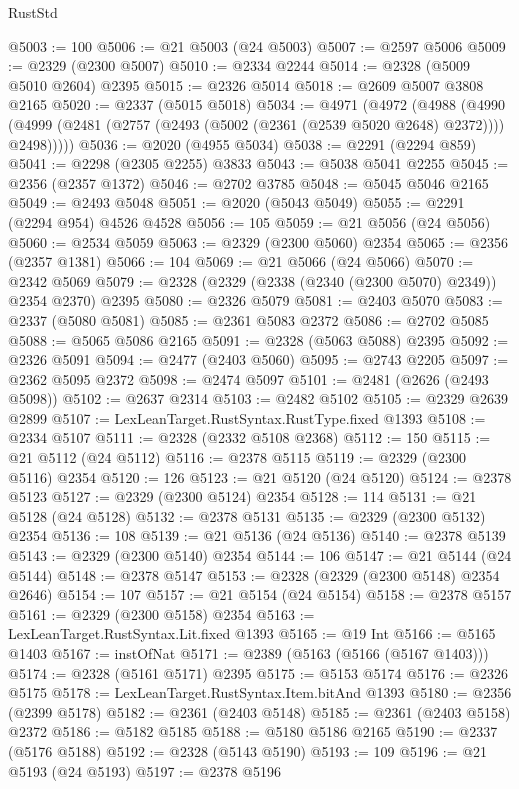 \begin{lexlean}{RustStd}
\begin{coremodule}
@5003 := 100
@5006 := @21 @5003 (@24 @5003)
@5007 := @2597 @5006
@5009 := @2329 (@2300 @5007)
@5010 := @2334 @2244
@5014 := @2328 (@5009 @5010 @2604) @2395
@5015 := @2326 @5014
@5018 := @2609 @5007 @3808 @2165
@5020 := @2337 (@5015 @5018)
@5034 := @4971
    (@4972
      (@4988
        (@4990 (@4999 (@2481 (@2757 (@2493 (@5002 (@2361 (@2539 @5020 @2648) @2372)))) @2498)))))
@5036 := @2020 (@4955 @5034)
@5038 := @2291 (@2294 @859)
@5041 := @2298 (@2305 @2255) @3833
@5043 := @5038 @5041 @2255
@5045 := @2356 (@2357 @1372)
@5046 := @2702 @3785
@5048 := @5045 @5046 @2165
@5049 := @2493 @5048
@5051 := @2020 (@5043 @5049)
@5055 := @2291 (@2294 @954) @4526 @4528
@5056 := 105
@5059 := @21 @5056 (@24 @5056)
@5060 := @2534 @5059
@5063 := @2329 (@2300 @5060) @2354
@5065 := @2356 (@2357 @1381)
@5066 := 104
@5069 := @21 @5066 (@24 @5066)
@5070 := @2342 @5069
@5079 := @2328 (@2329 (@2338 (@2340 (@2300 @5070) @2349)) @2354 @2370) @2395
@5080 := @2326 @5079
@5081 := @2403 @5070
@5083 := @2337 (@5080 @5081)
@5085 := @2361 @5083 @2372
@5086 := @2702 @5085
@5088 := @5065 @5086 @2165
@5091 := @2328 (@5063 @5088) @2395
@5092 := @2326 @5091
@5094 := @2477 (@2403 @5060)
@5095 := @2743 @2205
@5097 := @2362 @5095 @2372
@5098 := @2474 @5097
@5101 := @2481 (@2626 (@2493 @5098))
@5102 := @2637 @2314
@5103 := @2482 @5102
@5105 := @2329 @2639 @2899
@5107 := LexLeanTarget.RustSyntax.RustType.fixed @1393
@5108 := @2334 @5107
@5111 := @2328 (@2332 @5108 @2368)
@5112 := 150
@5115 := @21 @5112 (@24 @5112)
@5116 := @2378 @5115
@5119 := @2329 (@2300 @5116) @2354
@5120 := 126
@5123 := @21 @5120 (@24 @5120)
@5124 := @2378 @5123
@5127 := @2329 (@2300 @5124) @2354
@5128 := 114
@5131 := @21 @5128 (@24 @5128)
@5132 := @2378 @5131
@5135 := @2329 (@2300 @5132) @2354
@5136 := 108
@5139 := @21 @5136 (@24 @5136)
@5140 := @2378 @5139
@5143 := @2329 (@2300 @5140) @2354
@5144 := 106
@5147 := @21 @5144 (@24 @5144)
@5148 := @2378 @5147
@5153 := @2328 (@2329 (@2300 @5148) @2354 @2646)
@5154 := 107
@5157 := @21 @5154 (@24 @5154)
@5158 := @2378 @5157
@5161 := @2329 (@2300 @5158) @2354
@5163 := LexLeanTarget.RustSyntax.Lit.fixed @1393
@5165 := @19 Int
@5166 := @5165 @1403
@5167 := instOfNat
@5171 := @2389 (@5163 (@5166 (@5167 @1403)))
@5174 := @2328 (@5161 @5171) @2395
@5175 := @5153 @5174
@5176 := @2326 @5175
@5178 := LexLeanTarget.RustSyntax.Item.bitAnd @1393
@5180 := @2356 (@2399 @5178)
@5182 := @2361 (@2403 @5148)
@5185 := @2361 (@2403 @5158) @2372
@5186 := @5182 @5185
@5188 := @5180 @5186 @2165
@5190 := @2337 (@5176 @5188)
@5192 := @2328 (@5143 @5190)
@5193 := 109
@5196 := @21 @5193 (@24 @5193)
@5197 := @2378 @5196

\end{coremodule}
\end{lexlean}
